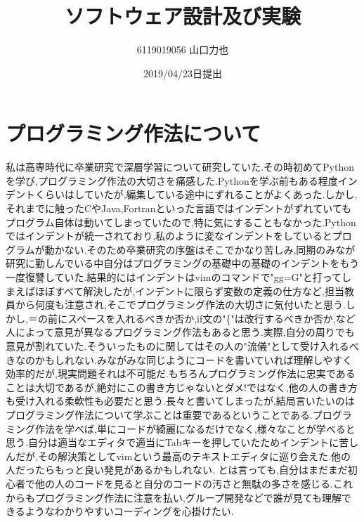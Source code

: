 \documentclass{jarticle}
\title{ソフトウェア設計及び実験\\}
\author{6119019056 山口力也}
\date{2019/04/23日提出}
\begin{document}
\maketitle
\section{プログラミング作法について}

私は高専時代に卒業研究で深層学習について研究していた.その時初めてPythonを学び,プログラミング作法の大切さを痛感した.Pythonを学ぶ前もある程度インデントくらいはしていたが,編集している途中にずれることがよくあった.しかし,それまでに触ったCやJava,Fortranといった言語ではインデントがずれていてもプログラム自体は動いてしまっていたので,特に気にすることもなかった.Pythonではインデントが統一されており,私のように変なインデントをしているとプログラムが動かない.そのため卒業研究の序盤はそこでかなり苦しみ,同期のみなが研究に勤しんでいる中自分はプログラミングの基礎中の基礎のインデントをもう一度復讐していた.結果的にはインデントはvimのコマンドで"gg=G"と打ってしまえばほぼすべて解決したが,インデントに限らず変数の定義の仕方など,担当教員から何度も注意され,そこでプログラミング作法の大切さに気付いたと思う.しかし,＝の前にスペースを入れるべきか否か,if文の"\{"は改行するべきか否か,など人によって意見が異なるプログラミング作法もあると思う.実際,自分の周りでも意見が割れていた.そういったものに関してはその人の"流儀"として受け入れるべきなのかもしれない.みながみな同じようにコードを書いていれば理解しやすく効率的だが,現実問題それは不可能だ.もちろんプログラミング作法に忠実であることは大切であるが,絶対にこの書き方じゃないとダメ!ではなく,他の人の書き方も受け入れる柔軟性も必要だと思う.長々と書いてしまったが,結局言いたいのはプログラミング作法について学ぶことは重要であるということである.プログラミング作法を学べば,単にコードが綺麗になるだけでなく,様々なことが学べると思う.自分は適当なエディタで適当にTabキーを押していたためインデントに苦しんだが,その解決策としてvimという最高のテキストエディタに巡り会えた.他の人だったらもっと良い発見があるかもしれない.
とは言っても,自分はまだまだ初心者で他の人のコードを見ると自分のコードの汚さと無駄の多さを感じる.これからもプログラミング作法に注意を払い,グループ開発などで誰が見ても理解できるようなわかりやすいコーディングを心掛けたい.
\end{document}

